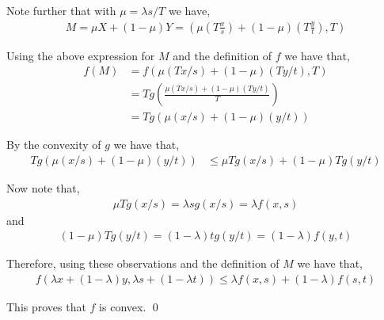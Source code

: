\documentclass[10pt]{article}
\begin{document}
\begin{solution}[Solution]
\begin{enumerate}[label=(\alph*)]
        Note further that with \( \mu = \lambda s / T \) we have,
        \begin{align*}
            M = \mu X + (1-\mu) Y 
            = \left(\mu \left( T \frac{x}{s} \right) + (1-\mu) \left( T \frac{y}{t} \right), T \right)
        \end{align*}

       
        Using the above expression for \( M \) and the definition of \( f \) we have that,
        \begin{align*}
            f(M)
            &= f( \mu (Tx/s) + (1-\mu)(Ty/t), T)
            \\&= T g \left( \frac{\mu (Tx/s) + (1-\mu) (Ty/t) }{T} \right)
            \\&= T g \left( \mu (x/s) + (1-\mu) (y/t) \right)
        \end{align*}

        By the convexity of \( g \) we have that,
        \begin{align*}
            T g \left( \mu (x/s) + (1-\mu) (y/t) \right)
            &\leq \mu T g(x/s) + (1-\mu) T g(y/t)
        \end{align*}

        Now note that,
        \begin{align*}
            \mu T g(x/s) = \lambda s g(x/s) = \lambda f(x,s)
        \end{align*}
        and
        \begin{align*}
            (1-\mu) T g(y/t) = (1-\lambda) t g(y/t) = (1-\lambda) f(y,t)
        \end{align*}
 
        Therefore, using these observations and the definition of \( M \) we have that,
        \begin{align*}
            f( \lambda x + (1-\lambda)y, \lambda s + (1-\lambda t))
            \leq \lambda f(x,s) + (1-\lambda)f(s,t)
        \end{align*}

        This proves that \( f \) is convex. \qed
        

        
        
\end{enumerate}
\end{solution}
\end{document}
